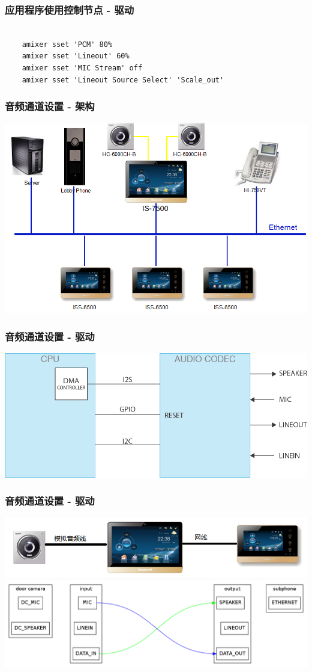 \documentclass[CJK]{beamer}
\begin{document}
\begin{frame}[fragile]
    \frametitle{应用程序使用控制节点 - 驱动}
    \begin{verbatim}

    amixer sset 'PCM' 80%
    amixer sset 'Lineout' 60%
    amixer sset 'MIC Stream' off
    amixer sset 'Lineout Source Select' 'Scale_out'

    \end{verbatim}
\end{frame}

\begin{frame}
    \frametitle{音频通道设置 - 架构}
        \includegraphics[height=200bp]{"ipvdp_sys_arch.png"}
\end{frame}

\begin{frame}
    \frametitle{音频通道设置 - 驱动}
        \includegraphics[height=120bp]{"hw_arch.jpg"}
\end{frame}

\begin{frame}
    \frametitle{音频通道设置 - 驱动}
    \includegraphics[height=50bp]{"audio_path_scene1.png"}
    \newline
    \includegraphics[height=120bp]{"audio_path_normal.png"}
\end{frame}
\end{document}
